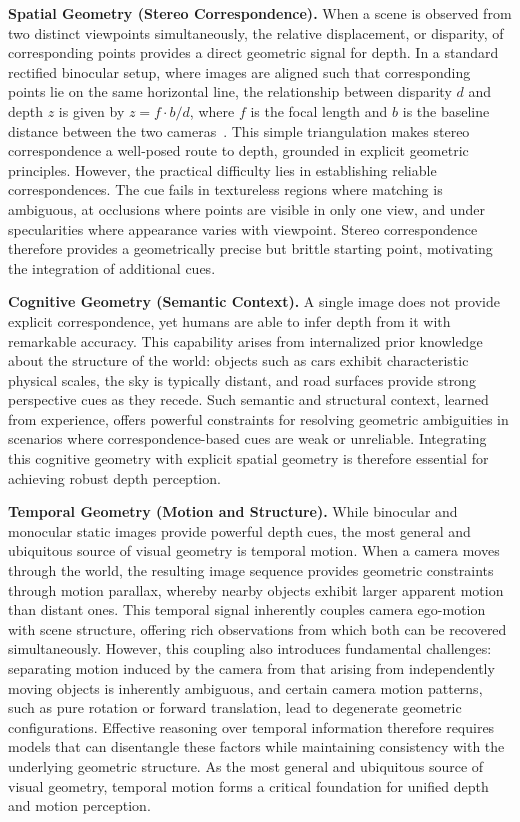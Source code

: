 \noindent\textbf{Spatial Geometry (Stereo Correspondence).} When a scene is observed from two distinct viewpoints simultaneously, the relative displacement, or disparity, of corresponding points provides a direct geometric signal for depth.
In a standard rectified binocular setup, where images are aligned such that corresponding points lie on the same horizontal line, the relationship between disparity $d$ and depth $z$ is given by $z=f\cdot b / d$, where $f$ is the focal length and $b$ is the baseline distance between the two cameras~\cite{hartley2003multiple}.
This simple triangulation makes stereo correspondence a well-posed route to depth, grounded in explicit geometric principles.
However, the practical difficulty lies in establishing reliable correspondences.
The cue fails in textureless regions where matching is ambiguous, at occlusions where points are visible in only one view, and under specularities where appearance varies with viewpoint.
Stereo correspondence therefore provides a geometrically precise but brittle starting point, motivating the integration of additional cues.

\noindent\textbf{Cognitive Geometry (Semantic Context).} A single image does not provide explicit correspondence, yet humans are able to infer depth from it with remarkable accuracy.
This capability arises from internalized prior knowledge about the structure of the world: objects such as cars exhibit characteristic physical scales, the sky is typically distant, and road surfaces provide strong perspective cues as they recede.
Such semantic and structural context, learned from experience, offers powerful constraints for resolving geometric ambiguities in scenarios where correspondence-based cues are weak or unreliable.
Integrating this cognitive geometry with explicit spatial geometry is therefore essential for achieving robust depth perception.

\noindent\textbf{Temporal Geometry (Motion and Structure).} While binocular and monocular static images provide powerful depth cues, the most general and ubiquitous source of visual geometry is temporal motion.
When a camera moves through the world, the resulting image sequence provides geometric constraints through motion parallax, whereby nearby objects exhibit larger apparent motion than distant ones.
This temporal signal inherently couples camera ego-motion with scene structure, offering rich observations from which both can be recovered simultaneously.
However, this coupling also introduces fundamental challenges: separating motion induced by the camera from that arising from independently moving objects is inherently ambiguous, and certain camera motion patterns, such as pure rotation or forward translation, lead to degenerate geometric configurations.
Effective reasoning over temporal information therefore requires models that can disentangle these factors while maintaining consistency with the underlying geometric structure.
As the most general and ubiquitous source of visual geometry, temporal motion forms a critical foundation for unified depth and motion perception.

